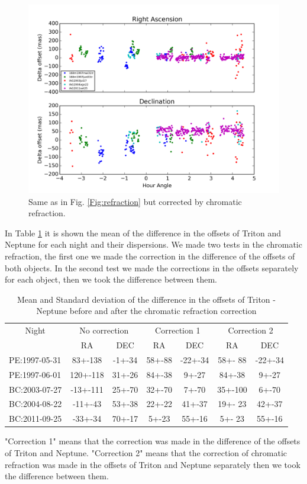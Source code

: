 \documentclass[12pt,a4paper]{report}
\begin{document}
\begin{figure}[h]
\includegraphics[width=16.0cm]{plot_hour_dif_cor.png} 
\caption{Same as in Fig. \ref{Fig:refraction} but corrected by chromatic refraction.}
\label{Fig:refraction-cor}
\end{figure}

In Table \ref{Tab:refraction} it is shown the mean of the difference in the offsets of Triton and Neptune for each night and their dispersions. We made two tests in the chromatic refraction, the first one we made the correction in the difference of the offsets of both objects. In the second test we made the corrections in the offsets separately for each object, then we took the difference between them.

\begin{table}[h]
\centering
\caption{Mean and Standard deviation of the difference in the offsets of Triton - Neptune before and after the chromatic refraction correction}
\label{Tab:refraction}
\begin{tabular}{|l|c|c|c|c|c|c|}
\hline
 \multicolumn{1}{|c|}{Night} & \multicolumn{2}{|c|}{No correction} & \multicolumn{2}{|c|}{Correction 1} & \multicolumn{2}{|c|}{Correction 2}\\
  & RA & DEC & RA & DEC & RA & DEC \\
 \hline
PE:1997-05-31 &   83+-138 & -1+-34 &  58+-88 & -22+-34 & 58+- 88 & -22+-34 \\
PE:1997-06-01 &   120+-118 &  31+-26 &  84+-38 &  9+-27 & 84+-38 &  9+-27 \\
BC:2003-07-27  &  -13+-111 & 25+-70 &  32+-70 &  7+-70 & 35+-100 &  6+-70 \\
BC:2004-08-22  &   -11+-43 & 53+-38 &  22+-22 & 41+-37 & 19+- 23 & 42+-37 \\
BC:2011-09-25  &   -33+-34 & 70+-17 &   5+-23 & 55+-16  &  5+- 23 & 55+-16 \\
\hline
\end{tabular}
"Correction 1" means that the correction was made in the difference of the offsets of Triton and Neptune. "Correction 2" means that the correction of chromatic refraction was made in the offsets of Triton and Neptune separately then we took the difference between them.
\end{table}
\end{document}
